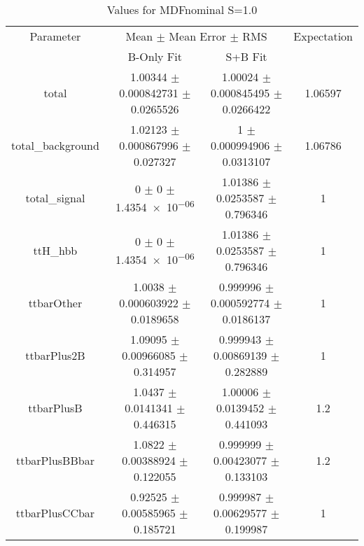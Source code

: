 \begin{table}
\centering
\caption{Values for MDFnominal S=1.0}
\begin{tabular}{cccc}
\toprule
Parameter & \multicolumn{2}{c}{Mean $\pm$ Mean Error $\pm$ RMS} & Expectation\\
 & B-Only Fit & S+B Fit & \\
\midrule
total & \num{1.00344} $\pm$ \num{0.000842731} $\pm$ \num{0.0265526} & \num{1.00024} $\pm$ \num{0.000845495} $\pm$ \num{0.0266422} & \num{1.06597}\\
total\_background & \num{1.02123} $\pm$ \num{0.000867996} $\pm$ \num{0.027327} & \num{1} $\pm$ \num{0.000994906} $\pm$ \num{0.0313107} & \num{1.06786}\\
total\_signal & \num{0} $\pm$ \num{0} $\pm$ \num{1.4354e-06} & \num{1.01386} $\pm$ \num{0.0253587} $\pm$ \num{0.796346} & \num{1}\\
ttH\_hbb & \num{0} $\pm$ \num{0} $\pm$ \num{1.4354e-06} & \num{1.01386} $\pm$ \num{0.0253587} $\pm$ \num{0.796346} & \num{1}\\
ttbarOther & \num{1.0038} $\pm$ \num{0.000603922} $\pm$ \num{0.0189658} & \num{0.999996} $\pm$ \num{0.000592774} $\pm$ \num{0.0186137} & \num{1}\\
ttbarPlus2B & \num{1.09095} $\pm$ \num{0.00966085} $\pm$ \num{0.314957} & \num{0.999943} $\pm$ \num{0.00869139} $\pm$ \num{0.282889} & \num{1}\\
ttbarPlusB & \num{1.0437} $\pm$ \num{0.0141341} $\pm$ \num{0.446315} & \num{1.00006} $\pm$ \num{0.0139452} $\pm$ \num{0.441093} & \num{1.2}\\
ttbarPlusBBbar & \num{1.0822} $\pm$ \num{0.00388924} $\pm$ \num{0.122055} & \num{0.999999} $\pm$ \num{0.00423077} $\pm$ \num{0.133103} & \num{1.2}\\
ttbarPlusCCbar & \num{0.92525} $\pm$ \num{0.00585965} $\pm$ \num{0.185721} & \num{0.999987} $\pm$ \num{0.00629577} $\pm$ \num{0.199987} & \num{1}\\
\bottomrule
\end{tabular}
\end{table}
